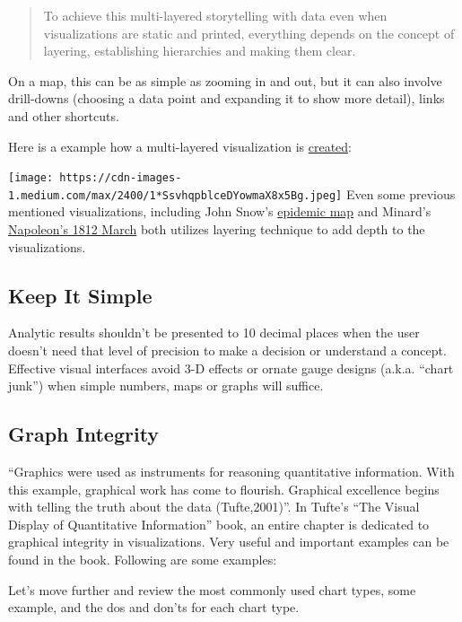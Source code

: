 \documentclass[]{book}
\begin{document}
\begin{quote}
To achieve this multi-layered storytelling with data even when visualizations are static and printed, everything depends on the concept of layering, establishing hierarchies and making them clear.
\end{quote}

On a map, this can be as simple as zooming in and out, but it can also involve drill-downs (choosing a data point and expanding it to show more detail), links and other shortcuts.

Here is a example how a multi-layered visualization is
\href{https://medium.com/accurat-studio/the-architecture-of-a-data-visualization-470b807799b4}{created}:

\texttt{[image: https://cdn-images-1.medium.com/max/2400/1*SsvhqpblceDYowmaX8x5Bg.jpeg]}
Even some previous mentioned visualizations, including John Snow's \href{images/Snow.png}{epidemic map} and Minard's \href{images/Minard.png}{Napoleon's 1812 March} both utilizes layering technique to add depth to the visualizations.

\hypertarget{keep-it-simple}{%
\subsection{Keep It Simple}\label{keep-it-simple}}

Analytic results shouldn't be presented to 10 decimal places when the user doesn't need that level of precision to make a decision or understand a concept. Effective visual interfaces avoid 3-D effects or ornate gauge designs (a.k.a. ``chart junk'') when simple numbers, maps or graphs will suffice.

\hypertarget{graph-integrity}{%
\subsection{Graph Integrity}\label{graph-integrity}}

``Graphics were used as instruments for reasoning quantitative information. With this example, graphical work has come to flourish. Graphical excellence begins with telling the truth about the data (Tufte,2001)''.
In Tufte's ``The Visual Display of Quantitative Information'' book, an entire chapter is dedicated to graphical integrity in visualizations. Very useful and important examples can be found in the book. Following are some examples:

Let's move further and review the most commonly used chart types, some example, and the dos and don'ts for each chart type.
\end{document}
